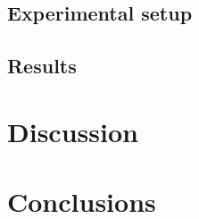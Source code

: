 \documentclass[12pt,english]{article}
\begin{document}
\subsection{Experimental setup}

\subsection{Results}


\section{Discussion}

\section{Conclusions}

\newpage


\doclicenseThis
\end{document}
